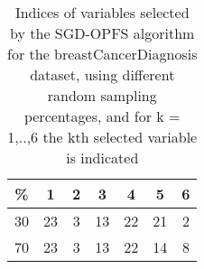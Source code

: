 \begin{table}
	\begin{center}
		\begin{tabular}{c c c c c c c}
			\% & 1 & 2 & 3 & 4 & 5 & 6 \\
			\hline
			30 & 23 & 3 & 13 & 22 & 21 & 2 \\
			70 & 23 & 3 & 13 & 22 & 14 & 8 \\
		\end{tabular}
	\end{center}
	\caption{Indices of variables selected by the SGD-OPFS algorithm for the breastCancerDiagnosis dataset, using different random sampling percentages, and for k = 1,..,6 the kth selected variable is indicated}
\end{table}